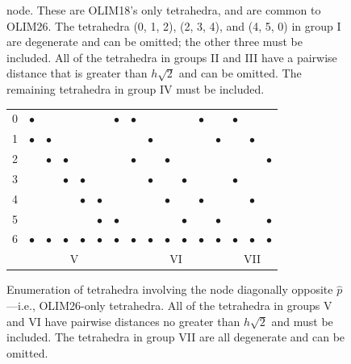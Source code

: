 \documentclass[eikonal.tex]{subfiles}
\begin{document}
\begin{figure}[H]
{    node. These are OLIM18's only tetrahedra, and are common to
    OLIM26. The tetrahedra (0, 1, 2), (2, 3, 4), and (4, 5, 0) in
    group I are degenerate and can be omitted; the other three must be
    included. All of the tetrahedra in groups II and III have a
    pairwise distance that is greater than $h \sqrt{2}$ and can be
    omitted. The remaining tetrahedra in group IV must be
    included.}\label{fig:olim18-tetrahedra}
  \vspace{1em}
  \begin{tabular}{c|cccccc|cccccc|ccc}
    0 & $\bullet$ & & & & & $\bullet$ & $\bullet$ & & & & $\bullet$ & & $\bullet$ & & \\
    1 & $\bullet$ & $\bullet$ & & & & & & $\bullet$ & & & & $\bullet$ & & $\bullet$ & \\
    2 & & $\bullet$ & $\bullet$ & & & & $\bullet$ & & $\bullet$ & & & & & & $\bullet$ \\
    3 & & & $\bullet$ & $\bullet$ & & & & $\bullet$ & & $\bullet$ & & & $\bullet$ & & \\
    4 & & & & $\bullet$ & $\bullet$ & & & & $\bullet$ & & $\bullet$ & & & $\bullet$ & \\
    5 & & & & & $\bullet$ & $\bullet$ & & & & $\bullet$ & & $\bullet$ & & & $\bullet$ \\
    6 & $\bullet$ & $\bullet$ & $\bullet$ & $\bullet$ & $\bullet$ & $\bullet$ & $\bullet$ & $\bullet$ & $\bullet$ & $\bullet$ & $\bullet$ & $\bullet$ & $\bullet$ & $\bullet$ & $\bullet$ \\
    \multicolumn{1}{c}{} & \multicolumn{6}{c}{V} & \multicolumn{6}{c}{VI} & \multicolumn{3}{c}{VII}
  \end{tabular}
  \caption{Enumeration of tetrahedra involving the node diagonally
    opposite $\hat{p}$---i.e., OLIM26-only tetrahedra. All of the
    tetrahedra in groups V and VI have pairwise distances no greater
    than $h \sqrt{2}$ and must be included. The tetrahedra in group
    VII are all degenerate and can be
    omitted.}\label{fig:olim26-tetrahedra}
  \vspace{1em}
\end{figure}
\end{document}
